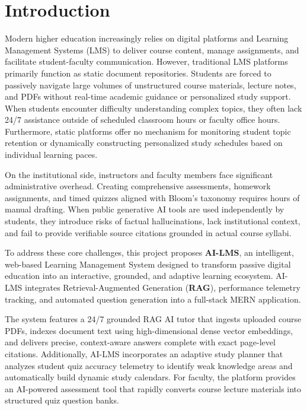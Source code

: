 \chapter{Introduction}

Modern higher education increasingly relies on digital platforms and Learning Management Systems (LMS) to deliver course content, manage assignments, and facilitate student-faculty communication. However, traditional LMS platforms primarily function as static document repositories. Students are forced to passively navigate large volumes of unstructured course materials, lecture notes, and PDFs without real-time academic guidance or personalized study support. When students encounter difficulty understanding complex topics, they often lack 24/7 assistance outside of scheduled classroom hours or faculty office hours. Furthermore, static platforms offer no mechanism for monitoring student topic retention or dynamically constructing personalized study schedules based on individual learning paces.

On the institutional side, instructors and faculty members face significant administrative overhead. Creating comprehensive assessments, homework assignments, and timed quizzes aligned with Bloom's taxonomy requires hours of manual drafting. When public generative AI tools are used independently by students, they introduce risks of factual hallucinations, lack institutional context, and fail to provide verifiable source citations grounded in actual course syllabi.

To address these core challenges, this project proposes \textbf{AI-LMS}, an intelligent, web-based Learning Management System designed to transform passive digital education into an interactive, grounded, and adaptive learning ecosystem. AI-LMS integrates Retrieval-Augmented Generation (\textbf{RAG}), performance telemetry tracking, and automated question generation into a full-stack MERN application.

The system features a 24/7 grounded RAG AI tutor that ingests uploaded course PDFs, indexes document text using high-dimensional dense vector embeddings, and delivers precise, context-aware answers complete with exact page-level citations. Additionally, AI-LMS incorporates an adaptive study planner that analyzes student quiz accuracy telemetry to identify weak knowledge areas and automatically build dynamic study calendars. For faculty, the platform provides an AI-powered assessment tool that rapidly converts course lecture materials into structured quiz question banks.

